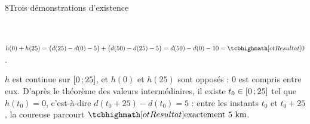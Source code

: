 \begin{corrige}{8}{Trois démonstrations d'existence}
\begin{minipage}[t]{0.4\linewidth}
\\[0.5mm]
\end{minipage}
\begin{questions}[start=4]
  \item $h(0)+h(25)=\big(d(25)-d(0)-5\big)+\big(d(50)-d(25)-5\big)=d(50)-d(0)-10=\res{0}$.
  \item $h$ est continue sur $\mathopen{[}0\,{;}\,25\mathclose{]}$, et $h(0)$ et $h(25)$ sont opposés : $0$ est compris entre eux. D'après le théorème
    des valeurs intermédiaires, il existe $t_0\in\mathopen{[}0\,{;}\,25\mathclose{]}$ tel que $h(t_0)=0$, c'est-à-dire $d(t_0+25)-d(t_0)=5$ : entre les
    instants $t_0$ et $t_0+25$, la coureuse parcourt $\res{\text{exactement }5\text{ km}}$.
\end{questions}
\end{corrige}

